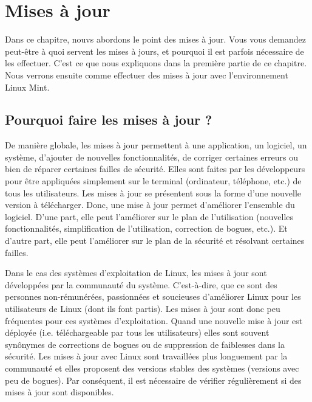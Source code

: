 \documentclass[12pt]{book}
\begin{document}
\chapter{Mises à jour}\label{sec:maj}
	Dans ce chapitre, nouvs abordons le point des mises à jour.
	Vous vous demandez peut-être à quoi servent les mises à jours, et pourquoi il est parfois nécessaire de les effectuer. C'est ce que nous expliquons dans la première partie de ce chapitre.
	Nous verrons ensuite comme effectuer des mises à jour avec l'environnement Linux Mint.
	\section{Pourquoi faire les mises à jour ?}\label{sec:maj_pourquoi}
		De manière globale, les mises à jour permettent à une application, un logiciel, un système, d'ajouter de nouvelles fonctionnalités, de corriger certaines erreurs ou bien de réparer certaines failles de sécurité.
		Elles sont faites par les développeurs pour être appliquées simplement sur le terminal (ordinateur, téléphone, etc.) de tous les utilisateurs.
		Les mises à jour se présentent sous la forme d'une nouvelle version à télécharger.
		Donc, une mise à jour permet d'améliorer l'ensemble du logiciel.
		D'une part, elle peut l'améliorer sur le plan de l'utilisation (nouvelles fonctionnalités, simplification de l'utilisation, correction de bogues, etc.).
		Et d'autre part, elle peut l'améliorer sur le plan de la sécurité et résolvant certaines failles.\par
		Dans le cas des systèmes d'exploitation de Linux, les mises à jour sont développées par la communauté du système.
		C'est-à-dire, que ce sont des personnes non-rémunérées, passionnées et soucieuses d'améliorer Linux pour les utilisateurs de Linux (dont ils font partis).
		Les mises à jour sont donc peu fréquentes pour ces systèmes d'exploitation.
		Quand une nouvelle mise à jour est déployée (i.e. téléchargeable par tous les utilisateurs) elles sont souvent synônymes de corrections de bogues ou de suppression de faiblesses dans la sécurité.
		Les mises à jour avec Linux sont travaillées plus longuement par la communauté et elles proposent des versions stables des systèmes (versions avec peu de bogues).
		Par conséquent, il est nécessaire de vérifier régulièrement si des mises à jour sont disponibles.
\end{document}
